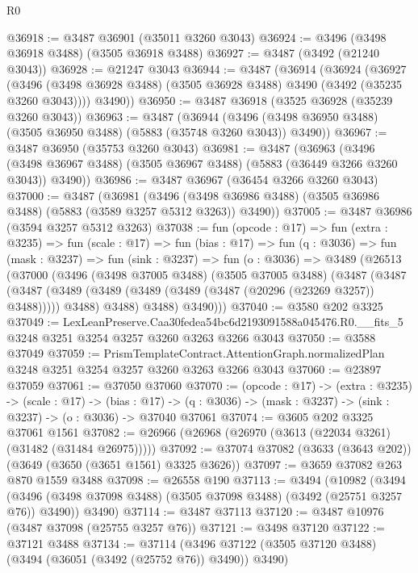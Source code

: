 \begin{lexlean}{R0}
\begin{coremodule}
@36918 := @3487 @36901 (@35011 @3260 @3043)
@36924 := @3496 (@3498 @36918 @3488) (@3505 @36918 @3488)
@36927 := @3487 (@3492 (@21240 @3043))
@36928 := @21247 @3043
@36944 := @3487
    (@36914
      (@36924
        (@36927
          (@3496 (@3498 @36928 @3488) (@3505 @36928 @3488) @3490 (@3492 (@35235 @3260 @3043))))
        @3490))
@36950 := @3487 @36918 (@3525 @36928 (@35239 @3260 @3043))
@36963 := @3487
    (@36944 (@3496 (@3498 @36950 @3488) (@3505 @36950 @3488) (@5883 (@35748 @3260 @3043)) @3490))
@36967 := @3487 @36950 (@35753 @3260 @3043)
@36981 := @3487
    (@36963
      (@3496 (@3498 @36967 @3488) (@3505 @36967 @3488) (@5883 (@36449 @3266 @3260 @3043)) @3490))
@36986 := @3487 @36967 (@36454 @3266 @3260 @3043)
@37000 := @3487
    (@36981
      (@3496 (@3498 @36986 @3488) (@3505 @36986 @3488) (@5883 (@3589 @3257 @5312 @3263)) @3490))
@37005 := @3487 @36986 (@3594 @3257 @5312 @3263)
@37038 := fun (opcode : @17) =>
  fun (extra : @3235) =>
  fun (scale : @17) =>
  fun (bias : @17) =>
  fun (q : @3036) =>
  fun (mask : @3237) =>
  fun (sink : @3237) =>
  fun (o : @3036) =>
  @3489
    (@26513
      (@37000
        (@3496
          (@3498 @37005 @3488)
          (@3505 @37005 @3488)
          (@3487
            (@3487
              (@3487 (@3489 (@3489 (@3489 (@3489 (@3487 (@20296 (@23269 @3257)) @3488))))) @3488)
              @3488)
            @3488)
          @3490)))
@37040 := @3580 @202 @3325
@37049 := LexLeanPreserve.Caa30fedea54bc6d2193091588a045476.R0.__fits_5
    @3248
    @3251
    @3254
    @3257
    @3260
    @3263
    @3266
    @3043
@37050 := @3588 @37049
@37059 := PrismTemplateContract.AttentionGraph.normalizedPlan
    @3248
    @3251
    @3254
    @3257
    @3260
    @3263
    @3266
    @3043
@37060 := @23897 @37059
@37061 := @37050 @37060
@37070 := (opcode : @17) ->
  (extra : @3235) ->
  (scale : @17) ->
  (bias : @17) -> (q : @3036) -> (mask : @3237) -> (sink : @3237) -> (o : @3036) -> @37040 @37061
@37074 := @3605 @202 @3325 @37061 @1561
@37082 := @26966 (@26968 (@26970 (@3613 (@22034 @3261) (@31482 (@31484 @26975)))))
@37092 := @37074 @37082 (@3633 (@3643 @202)) (@3649 (@3650 (@3651 @1561) @3325 @3626))
@37097 := @3659 @37082 @263 @870 @1559 @3488
@37098 := @26558 @190
@37113 := @3494
    (@10982
      (@3494 (@3496 (@3498 @37098 @3488) (@3505 @37098 @3488) (@3492 (@25751 @3257 @76)) @3490))
      @3490)
@37114 := @3487 @37113
@37120 := @3487 @10976 (@3487 @37098 (@25755 @3257 @76))
@37121 := @3498 @37120
@37122 := @37121 @3488
@37134 := @37114
    (@3496 @37122 (@3505 @37120 @3488) (@3494 (@36051 (@3492 (@25752 @76)) @3490)) @3490)

\end{coremodule}
\end{lexlean}
